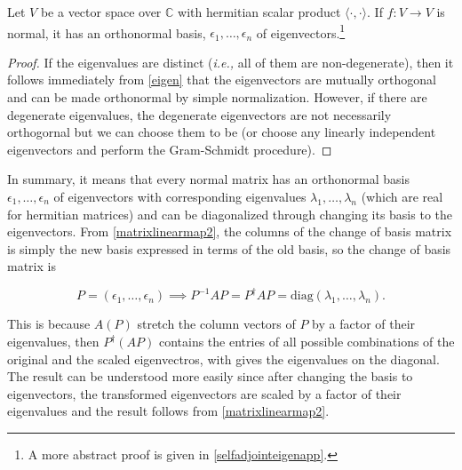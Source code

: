 \documentclass[a4paper,12pt]{report}
\begin{document}
\begin{theorem} \label{selfadjointeigen} 
    Let $V$ be a vector space over $\mathbb{C}$ with hermitian scalar product $\langle \cdot, \cdot \rangle$. If $f : V \to V$ is normal, it has an orthonormal basis, $\epsilon_1, \ldots, \epsilon_n$ of eigenvectors.\footnote{A more abstract proof is given in \cref{selfadjointeigenapp}.} 
\end{theorem}

\begin{proof}
If the eigenvalues are distinct (\textit{i.e.,} all of them are non-degenerate), then it follows immediately from \cref{eigen} that the eigenvectors are mutually orthogonal and can be made orthonormal by simple normalization. However, if there are degenerate eigenvalues, the degenerate eigenvectors are not necessarily orthogornal but we can choose them to be (or choose any linearly independent eigenvectors and perform the Gram-Schmidt procedure).
\end{proof}

    
In summary, it means that every normal matrix has an orthonormal basis $\epsilon_1, \ldots, \epsilon_n$ of eigenvectors with corresponding eigenvalues $\lambda_1, \ldots, \lambda_n$ (which are real for hermitian matrices) and can be diagonalized through changing its basis to the eigenvectors. From \cref{matrixlinearmap2}, the columns of the change of basis matrix is simply the new basis expressed in terms of the old basis, so the change of basis matrix is

\begin{equation}
    P = (\epsilon _{1}, \ldots , \epsilon _{n}  ) \implies  P^{-1} AP = P^\dagger AP = \text{diag}(\lambda_1, \ldots, \lambda_n).
\end{equation}

This is because \(A(P)\) stretch the column vectors of \(P\) by a factor of their eigenvalues, then \(P^{\dagger} (AP)\) contains the entries of all possible combinations of the original and the scaled eigenvectros, with gives the eigenvalues on the diagonal. The result can be understood more easily since after changing the basis to eigenvectors, the transformed eigenvectors are scaled by a factor of their eigenvalues and the result follows from \cref{matrixlinearmap2}. 
\end{document}

